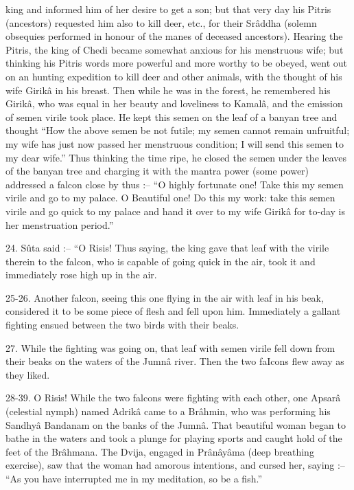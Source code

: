 king and informed him of her desire to get a son; but that very day his Pitris (ancestors) requested him also to kill deer, etc., for their Sr\^addha (solemn obsequies performed in honour of the manes of deceased ancestors). Hearing the Pitris, the king of Chedi became somewhat anxious for his menstruous wife; but thinking his Pitris words more powerful and more worthy to be obeyed, went out on an hunting expedition to kill deer and other animals, with the thought of his wife Girik\^a in his breast. Then while he was in the forest, he remembered his Girik\^a, who was equal in her beauty and loveliness to Kamal\^a, and the emission of semen virile took place. He kept this semen on the leaf of a banyan tree and thought ``How the above semen be not futile; my semen cannot remain unfruitful; my wife has just now passed her menstruous condition; I will send this semen to my dear wife.'' Thus thinking the time ripe, he closed the semen under the leaves of the banyan tree and charging it with the mantra power (some power) addressed a falcon close by thus :-- ``O highly fortunate one! Take this my semen virile and go to my palace. O Beautiful one! Do this my work: take this semen virile and go quick to my palace and hand it over to my wife Girik\^a for to-day is her menstruation period.''

24. S\^uta said :-- ``O Risis! Thus saying, the king gave that leaf with the virile therein to the falcon, who is capable of going quick in the air, took it and immediately rose high up in the air.

25-26. Another falcon, seeing this one flying in the air with leaf in his beak, considered it to be some piece of flesh and fell upon him. Immediately a gallant fighting ensued between the two birds with their beaks.

27. While the fighting was going on, that leaf with semen virile fell down from their beaks on the waters of the Jumn\^a river. Then the two faIcons flew away as they liked.

28-39. O Risis! While the two falcons were fighting with each other, one Apsar\^a (celestial nymph) named Adrik\^a came to a Br\^ahmin, who was performing his Sandhy\^a Bandanam on the banks of the Jumn\^a. That beautiful woman began to bathe in the waters and took a plunge for playing sports and caught hold of the feet of the Br\^ahmana. The Dvija, engaged in Pr\^an\^ay\^ama (deep breathing exercise), saw that the woman had amorous intentions, and cursed her, saying :-- ``As you have interrupted me in my meditation, so be a fish.''

